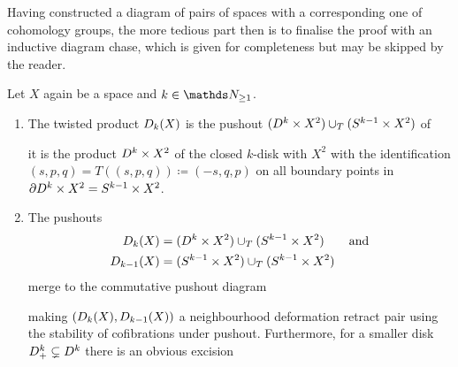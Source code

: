 Having constructed a diagram of pairs of spaces with a corresponding
one of cohomology groups, the more tedious part then is to finalise
the proof with an inductive diagram chase, which is given for
completeness but may be skipped by the reader.

\begin{Fact}
  Let $X$ again be a space and $k\in\Nat_{\geq1}$.
  \begin{enumerate}
  \item
    The twisted product $D_{k}({X})$ is the pushout
    $(D^{k}\times X^2)\cup_{T}(S^{k-1}\times X^2)$ of
    \begin{center}
    \end{center}
    \idest it is the product $D^{k}\times X^2$ of the closed
    $k$-disk with $X^2$ with the identification
    $(s,p,q)=T((s,p,q))\coloneqq(-s,q,p)$ on all boundary points in
    $\partial{D^{k}\times X^2}=S^{k-1}\times X^2$.
  \item
    The pushouts
    \begin{align*}
      D_{k}({X})
      &=(D^{k}\times X^2)\cup_{T}(S^{k-1}\times X^2)
        \qquad\text{and}\\
      D_{k-1}({X})
      &=(S^{k-1}\times X^2)\cup_{T}(S^{k-1}\times X^2)
    \end{align*}
    merge to the commutative pushout diagram
    \begin{center}
    \end{center}
    making $(D_{k}({X}), D_{k-1}({X}))$ a neighbourhood
    deformation retract pair using the stability of cofibrations under pushout.
    Furthermore, for a smaller disk $D^{k}_+\subsetneq D^{k}$
    there is an obvious excision

\end{enumerate}
\end{Fact}
